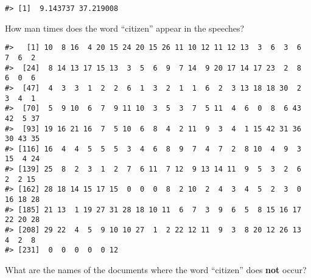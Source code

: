 \documentclass[]{book}
\newenvironment{Shaded}{\begin{snugshade}}{\end{snugshade}}
\newcommand{\KeywordTok}[1]{\textcolor[rgb]{0.13,0.29,0.53}{\textbf{#1}}}
\newcommand{\NormalTok}[1]{#1}
\newcommand{\OperatorTok}[1]{\textcolor[rgb]{0.81,0.36,0.00}{\textbf{#1}}}
\newcommand{\StringTok}[1]{\textcolor[rgb]{0.31,0.60,0.02}{#1}}
\begin{document}
\begin{Shaded}
\end{Shaded}

\begin{verbatim}
#> [1]  9.143737 37.219008
\end{verbatim}

How man times does the word ``citizen'' appear in the speeches?

\begin{Shaded}
\end{Shaded}

\begin{verbatim}
#>   [1] 10  8 16  4 20 15 24 20 15 26 11 10 12 11 12 13  3  6  3  6  7  6  2
#>  [24]  8 14 13 17 15 13  3  5  6  9  7 14  9 20 17 14 17 23  2  8  6  0  6
#>  [47]  4  3  3  1  2  2  6  1  3  2  1  1  6  2  3 13 18 18 30  2  3  4  1
#>  [70]  5  9 10  6  7  9 11 10  3  5  3  7  5 11  4  6  0  8  6 43 42  5 37
#>  [93] 19 16 21 16  7  5 10  6  8  4  2 11  9  3  4  1 15 42 31 36 30 43 35
#> [116] 16  4  4  5  5  5  3  4  6  8  9  7  4  7  2  8 10  4  9  3 15  4 24
#> [139] 25  8  2  3  1  2  7  6 11  7 12  9 13 14 11  9  5  3  2  6  2  2 15
#> [162] 28 18 14 15 17 15  0  0  0  8  2 10  2  4  3  4  5  2  3  0 16 18 28
#> [185] 21 13  1 19 27 31 28 18 10 11  6  7  3  9  6  5  8 15 16 17 22 20 28
#> [208] 29 22  4  5  9 10 10 27  1  2 22 12 11  9  3  8 20 12 26 13  4  2  8
#> [231]  0  0  0  0  0 12
\end{verbatim}

What are the names of the documents where the word ``citizen'' does \textbf{not} occur?

\begin{Shaded}
\end{Shaded}
\end{document}
